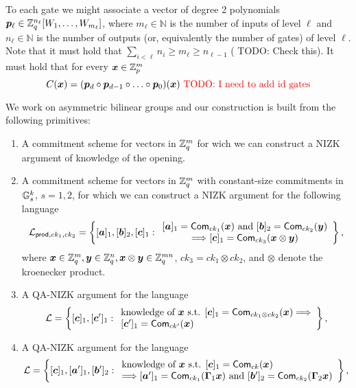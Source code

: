 To each gate we might associate a vector of degree 2 polynomials ${\boldsymbol{p}}_\ell \in \mathbb{Z}_q^{n_\ell}[W_1,\ldots,W_{m_\ell}]$, where $m_\ell\in\mathbb{N}$ is the number of inputs of level $\ell$ and $n_\ell\in\mathbb{N}$ is the number of outputs (or, equivalently the number of gates) of level $\ell$. Note that it must hold that $\sum_{i<\ell} n_i\geq m_\ell \geq n_{\ell-1}$ ({\color{red} TODO: Check this}). It must hold that for every ${\boldsymbol{x}}\in\mathbb{Z}_p^m$
$$
C({\boldsymbol{x}}) = ({\boldsymbol{p}}_{d}\circ{\boldsymbol{p}}_{d-1}\circ\ldots\circ {\boldsymbol{p}}_0) ({\boldsymbol{x}}) \text{  \color{red} TODO: I need to add id gates}
$$

We work on asymmetric bilinear groups and our construction is built from the following primitives:
\begin{enumerate}
\item A commitment scheme for vectors in $\mathbb{Z}_q^m$ for wich we can construct a NIZK argument of knowledge of the opening.
\item A commitment scheme for vectors in $\mathbb{Z}_q^m$ with constant-size commitments in $\mathbb{G}_s^k$, $s=1,2$, for which we can construct a NIZK argument for the following language
$$
\mathcal{L}_{\mathsf{prod},ck_1,ck_2}=\left\{[{\boldsymbol{a}}]_1,[{\boldsymbol{b}}]_2,[{\boldsymbol{c}}]_1:
	\begin{array}{c}
		[{\boldsymbol{a}}]_1=\mathsf{Com}_{ck_1}({\boldsymbol{x}})\text{ and }
		[{\boldsymbol{b}}]_2=\mathsf{Com}_{ck_2}({\boldsymbol{y}})\\
		\Longrightarrow
		[{\boldsymbol{c}}]_1=\mathsf{Com}_{ck_3}({\boldsymbol{x}}\otimes{\boldsymbol{y}})
	\end{array}\right\},
$$
where ${\boldsymbol{x}}\in\mathbb{Z}_q^m,{\boldsymbol{y}}\in\mathbb{Z}_q^n,{\boldsymbol{x}}\otimes{\boldsymbol{y}}\in\mathbb{Z}_q^{mn}$, $ck_3=ck_1\otimes ck_2$, and $\otimes$ denote the kroenecker product.
\item A QA-NIZK argument for the language
$$
\mathcal{L} = \left\{[{\boldsymbol{c}}]_1,[{\boldsymbol{c}}']_1:
	\begin{array}{l} \text{knowledge of } {\boldsymbol{x}} \text{ s.t. }
		{[{\boldsymbol{c}}]_1=\mathsf{Com}_{ck_1\otimes ck_2}({\boldsymbol{x}})}
		\Longrightarrow\\
		{[{\boldsymbol{c}}']_1=\mathsf{Com}_{ck'}({\boldsymbol{x}})}
	\end{array}\right\},
$$
\item A QA-NIZK argument for the language
$$
\mathcal{L} = \left\{[{\boldsymbol{c}}]_1,[{\boldsymbol{a}}']_1,[{\boldsymbol{b}}']_2:
	\begin{array}{l}
		\text{knowledge of } {\boldsymbol{x}} \text{ s.t. }[{\boldsymbol{c}}]_1=\mathsf{Com}_{ck}({\boldsymbol{x}})\\
		\Longrightarrow
		[{\boldsymbol{a}}']_1=\mathsf{Com}_{ck_1}(\mathbf{{\Gamma}}_1{\boldsymbol{x}})\text{ and }
		[{\boldsymbol{b}}']_2=\mathsf{Com}_{ck_2}(\mathbf{{\Gamma}}_2{\boldsymbol{x}})
	\end{array}\right\},
$$
\end{enumerate}

